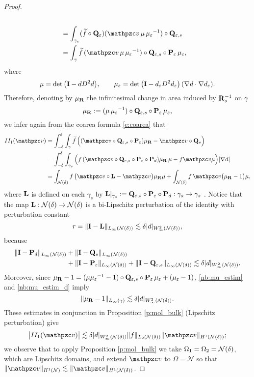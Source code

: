 \begin{proof}
\begin{equation}
\begin{split}
  \\ &=
  \int_{\gae} (\wf \circ \bQe) (\tv \, \mu \, \mue^{-1}) \circ \bQes
  \\ &=
  \int_\gamma \wf \, (\tv \, \mu \, \mue^{-1} ) \circ \bQes\circ \bPe \, \mue,
\end{split}
\end{equation}
%
where
%
\[
\mu = \det \big({\bf I}-d  D^2 d \big),
\qquad \mu_{\varepsilon} = \det \big({\bf I}-d_\varepsilon  D^2 d_\varepsilon \big) \, (\nabla d \cdot \nabla d_\varepsilon).
\]
%
Therefore, denoting by $\mu_{\bf R}$ the infinitesimal change in area induced by
${\bf R}_s^{-1}$ on $\gamma$
%
\[
\mu_{\bf R} := (\mu \, {\mu_{\varepsilon}}^{-1}) \circ {\mathbf{Q}_{\ensuremath{\varepsilon},s}}\circ{{\bf P}_\varepsilon} \, {\mu_{\varepsilon}},
\]
%
we infer again from the coarea formula \eqref{e:coarea} that
%
\begin{align*}
II_1(\tv) &= \int_{-\delta}^\delta \int_\gamma \wf \, \Big( (\tv \circ \bQes\circ \bPe) \mu_\bR - \tv\circ\bQs \Big)
\\ & =
\int_{-\delta}^\delta \int_{\gamma_s} \Big( f \, (\tv \circ \bQes\circ \bPe \circ \bP_d) \mu_\bR \, \mu - f  \tv \mu \Big) |\nabla d|
\\ &=
\int_\Nd f \, \big(\tv \circ \bL - \tv \big) \mu_\bR\mu
+ \int_\Nd f \, \tv \big(\mu_\bR -1 \big) \mu,
\end{align*}
%
where ${\bf L}$ is defined on each $\gamma_s$ by ${\bf L}|_{\gamma_s}  := {\mathbf{Q}_{\varepsilon,s}}\circ {{\bf P}_\varepsilon} \circ {\bf P}_d: \gamma_s \rightarrow \gamma_s$ .
Notice that the map ${\bf L} :{\mathcal{N}(\delta)}\to{\mathcal{N}(\delta)}$ is a
bi-Lipschitz perturbation of the identity with perturbation constant
%
\[
r = \|{\bf I} - {\bf L}\|_{L_\infty({\mathcal{N}(\delta)})} \lesssim \delta |d|_{W^2_\infty({\mathcal{N}(\delta)})},
\]
%
because
%
\begin{align*}
\| {\bf I} -{\bf P}_d\|_{L_\infty(\mathcal N(\delta))} &+ \| {\bf I} - {\bf Q}_{s} \|_{L_\infty(\mathcal N(\delta))}\\& + 
\| {\bf I} -{\bf P}_{\varepsilon}\|_{L_\infty(\mathcal N(\delta))} + \| {\bf I} -{\bf Q}_{\varepsilon,s}\|_{L_\infty(\mathcal N(\delta))} \lesssim \delta  |d|_{W^2_\infty({\mathcal{N}(\delta)})}.
\end{align*}
%
Moreover, since $\mu_{\bf R} - 1 = (\mu{\mu_{\ensuremath{\varepsilon}}}^{-1}-1) \circ {\mathbf{Q}_{\ensuremath{\varepsilon},s}}\circ{{\bf P}_\varepsilon} \, {\mu_{\varepsilon}} +
({\mu_{\varepsilon}}-1)$, \eqref{nb:mu_estim} and \eqref{nb:mu_estim_d} imply
%
\[
\| \mu_{\bf R} -1 \|_{L_\infty(\gamma)} \lesssim \delta  |d|_{W^2_\infty({\mathcal{N}(\delta)})}.
\]
%
These estimates in conjunction in Proposition \ref{p:mol_bulk} (Lipschitz perturbation)
give
%
\[
\big| II_1(\tv) \big| 
\lesssim \delta  |d|_{W^2_\infty(\Nd)} \|f\|_{L_2(\Nd)} \|\tv\|_{H^1(\Nd)};
\]
%
we observe that to apply Proposition \ref{p:mol_bulk} we take
$\Omega_1=\Omega_2={\mathcal{N}(\delta)}$,
which are Lipschitz domains, and extend $\tv$ to $\Omega=\mathcal{N}$
so that $\|\tv\|_{H^1(\mathcal{N})} \lesssim \|\tv\|_{H^1(\Nd)}$.


\end{proof}
